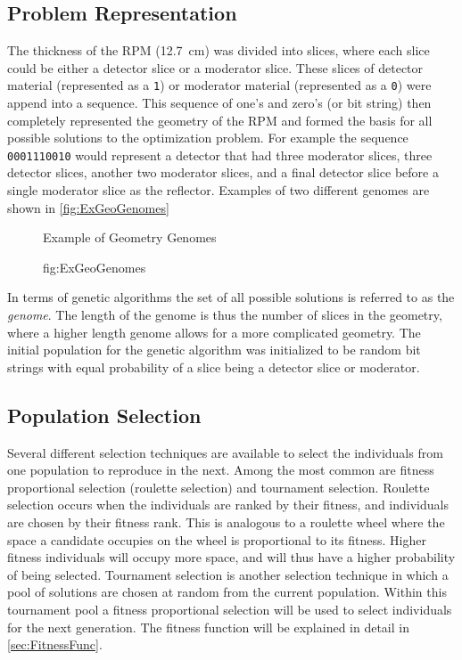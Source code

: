 \subsection{Problem Representation}
The thickness of the RPM  (\SI{12.7}{\cm}) was divided into slices, where each slice could be either a detector slice or a moderator slice.
These slices of detector material (represented as a \verb+1+) or moderator material (represented as a \verb+0+) were append into a sequence.
This sequence of one's and zero's (or bit string) then completely represented the geometry of the RPM and formed the basis for all possible solutions to the optimization problem.
For example the sequence \verb+0001110010+ would represent a detector that had three moderator slices, three detector slices, another two moderator slices, and a final detector slice before a single moderator slice as the reflector.
Examples of two different genomes are shown in \autoref{fig:ExGeoGenomes}
\begin{figure}

  \caption[Example Geometries Genomes]{Example of Geometry Genomes}
  \caption{fig:ExGeoGenomes}
\end{figure}
In terms of genetic algorithms the set of all possible solutions is referred to as the \textit{genome}.
The length of the genome is thus the number of slices in the geometry, where a higher length genome allows for a more complicated geometry.
The initial population for the genetic algorithm was initialized to be random bit strings with equal probability of a slice being a detector slice or moderator.

\subsection{Population Selection}
Several different selection techniques are available to select the individuals from one population to reproduce in the next.
Among the most common are fitness proportional selection (roulette selection) and tournament selection.
Roulette selection occurs when the individuals are ranked by their fitness, and individuals are chosen by their fitness rank.
This is analogous to a roulette wheel where the space a candidate occupies on the wheel is proportional to its fitness.
Higher fitness individuals will occupy more space, and will thus have a higher probability of being selected.
Tournament selection is another selection technique in which a pool of solutions are chosen at random from the current population.
Within this tournament pool a fitness proportional selection will be used to select individuals for the next generation.
The fitness function will be explained in detail in \autoref{sec:FitnessFunc}.

